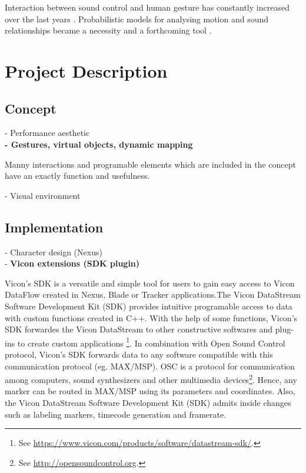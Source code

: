 \documentclass{nime-alternate}
\begin{document}
Interaction between sound control and human gesture has constantly increased over the last years \cite{Gestureanalysis}. Probabilistic models for analysing motion and sound relationships became a necessity and a forthcoming tool \cite{probabilisticmodels}.

\section{Project Description}

\subsection{Concept}

- Performance aesthetic\\

\textbf{- Gestures, virtual objects, dynamic mapping}\\ \par
Manny interactions and programable elements which are included in the concept have an exactly function and usefulness.

- Visual environment

\subsection{Implementation}
- Character design (Nexus)\\

- \textbf{Vicon extensions (SDK plugin)} \par
Vicon's SDK is a versatile and simple tool for users to gain easy access to Vicon DataFlow created in Nexus, Blade or Tracker applications.The Vicon DataStream Software Development Kit (SDK) provides intuitive programable access to data with custom functions created in C++. With the help of some functions, Vicon's SDK forwardes the Vicon DataStream to other constructive softwares and plug-ins to create custom applications \footnote{See \url{https://www.vicon.com/products/software/datastream-sdk/}.}. In combination with Open Sound Control protocol, Vicon's SDK forwards data to any software compatible with this communication protocol (eg. MAX/MSP). OSC is a protocol for communication among computers, sound synthesizers and other multimedia devices\footnote{See  \url{http://opensoundcontrol.org}.}. Hence, any marker can be routed in MAX/MSP using its parameters and coordinates. Also, the Vicon DataStream Software Development Kit (SDK) admits inside changes such as labeling markers, timecode generation and framerate.
\end{document}
